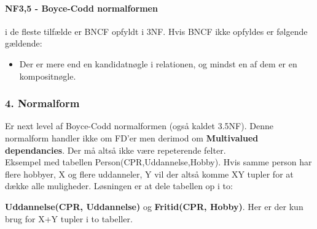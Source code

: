 \paragraph{NF3,5 - Boyce-Codd normalformen} i de fleste tilfælde er BNCF opfyldt i 3NF. Hvis BNCF ikke opfyldes er følgende gældende:
	
\begin{itemize}
	\item Der er mere end en kandidatnøgle i relationen, og mindst en af dem er en kompositnøgle.
\end{itemize}
	
\subsubsection{4. Normalform}
Er next level af Boyce-Codd normalformen (også kaldet 3.5NF). Denne normalform handler ikke om FD'er men derimod om \textbf{Multivalued dependancies}. Der må altså ikke være repeterende felter.\\

Eksempel med tabellen Person(CPR,Uddannelse,Hobby). Hvis samme person har flere hobbyer, X og flere uddanneler, Y vil der altså komme XY tupler for at dække alle muligheder. Løsningen er at dele tabellen op i to: 

\textbf{Uddannelse(CPR, Uddannelse)} og \textbf{Fritid(CPR, Hobby)}. Her er der kun brug for X+Y tupler i to tabeller.


